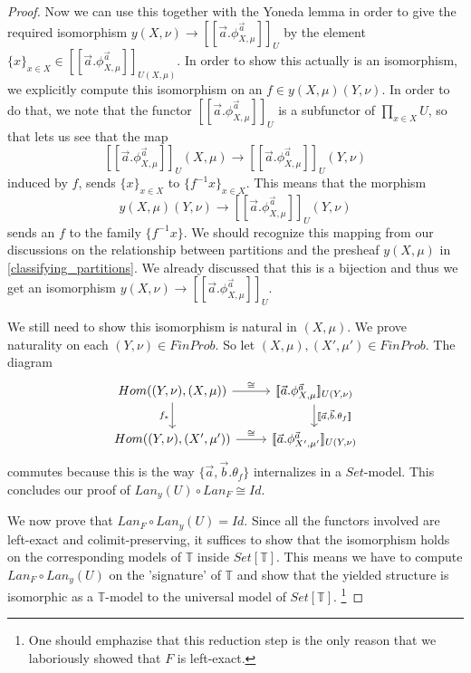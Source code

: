 \documentclass[a4paper]{amsproc}
\theoremstyle{plain}
\theoremstyle{definition}
\theoremstyle{remark}
\numberwithin{equation}{section}
\newcommand{\ldoub}{[\![ }
\newcommand{\rdoub}{]\!]}
\begin{document}
\begin{proof}
Now we can use this together with the Yoneda lemma in order to give the required isomorphism $y (X,\nu) \to \ldoub \vec{a} . \phi^{\vec{a}}_{X,\mu} \rdoub_U$ by the element $\{x\}_{x \in X} \in \ldoub \vec{a} . \phi^{\vec{a}}_{X,\mu} \rdoub_{U(X,\mu)}$. In order to show this actually is an isomorphism, we explicitly compute this isomorphism on an $f \in y (X,\mu) (Y,\nu)$. In order to do that, we note that the functor $\ldoub \vec{a} . \phi^{\vec{a}}_{X,\mu} \rdoub_U$ is a subfunctor of $\prod_{x \in X} U$, so that lets us see that the map
\[
\ldoub \vec{a} . \phi^{\vec{a}}_{X,\mu} \rdoub_U(X,\mu) \to \ldoub \vec{a} . \phi^{\vec{a}}_{X,\mu} \rdoub_U(Y,\nu)
\]
induced by $f$, sends $\{x\}_{x \in X}$ to $\{f^{-1} x\}_{x \in X}$. This means that the morphism
\[
y (X,\mu) (Y,\nu) \to \ldoub \vec{a} . \phi^{\vec{a}}_{X,\mu} \rdoub_U(Y,\nu)
\]
sends an $f$ to the family $\{f^{-1} x\}$. We should recognize this mapping from our discussions on the relationship between partitions and the presheaf $y (X,\mu)$ in \ref{classifying_partitions}. We already discussed that this is a bijection and thus we get an isomorphism $y (X,\nu) \to \ldoub \vec{a} . \phi^{\vec{a}}_{X,\mu} \rdoub_U$.

We still need to show this isomorphism is natural in $(X,\mu)$. We prove naturality on each $(Y,\nu) \in FinProb$. So let $(X,\mu), (X',\mu') \in FinProb$. The diagram
\[
\begin{tikzcd}
    {Hom((Y,\nu),(X,\mu))} \arrow[r, "\cong"] \arrow[d, "f_*"'] & {\ldoub \vec{a} . \phi^{\vec{a}}_{X,\mu} \rdoub_{U(Y,\nu)}} \arrow[d, "{\ldoub \vec{a},\vec{b} . \theta_f \rdoub}"] \\
    {Hom((Y,\nu),(X',\mu'))} \arrow[r, "\cong"]                 & {\ldoub \vec{a} . \phi^{\vec{a}}_{X',\mu'} \rdoub_{U(Y,\nu)}}                                             
\end{tikzcd}
\]
commutes because this is the way $\{\vec{a},\vec{b} . \theta_f \}$ internalizes in a $Set$-model. This concludes our proof of $Lan_y(U) \circ Lan_F \cong Id$.

We now prove that $Lan_F \circ Lan_y(U) = Id$. Since all the functors involved are left-exact and colimit-preserving, it suffices to show that the isomorphism holds on the corresponding models of $\mathbb{T}$ inside $Set[\mathbb{T}]$. This means we have to compute $Lan_F \circ Lan_y(U)$ on the 'signature' of $\mathbb{T}$ and show that the yielded structure is isomorphic as a $\mathbb{T}$-model to the universal model of $Set[\mathbb{T}]$. \footnote{One should emphazise that this reduction step is the only reason that we laboriously showed that $F$ is left-exact.}


\end{proof}
\end{document}
